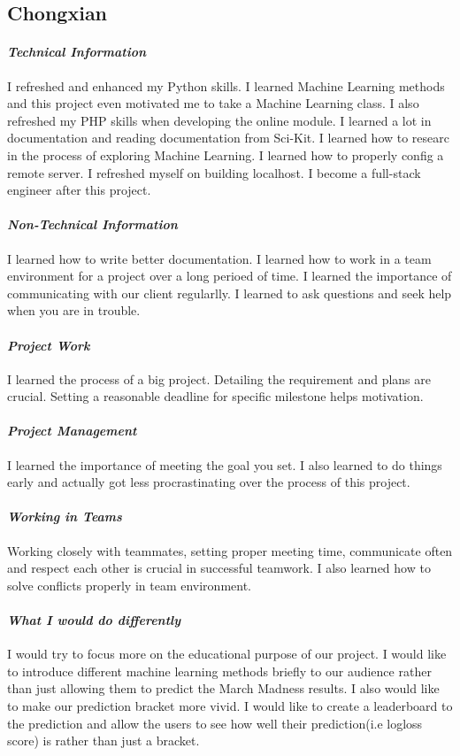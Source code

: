 \documentclass[onecolumn, draftclsnofoot,10pt, compsoc]{IEEEtran}
\begin{document}
\subsection{Chongxian}
\paragraph{\emph{Technical Information}}
I refreshed and enhanced my Python skills. I learned Machine Learning methods and this project even motivated me to take a Machine Learning class. I also refreshed my PHP skills when developing the online module. I learned a lot in documentation and reading documentation from Sci-Kit. I learned how to researc in the process of exploring Machine Learning. I learned how to properly config a remote server. I refreshed myself on building localhost. I become a full-stack engineer after this project.
\paragraph{\emph{Non-Technical Information}}
I learned how to write better documentation. I learned how to work in a team environment for a project over a long perioed of time. I learned the importance of communicating with our client regularlly. I learned to ask questions and seek help when you are in trouble. 
\paragraph{\emph{Project Work}}
I learned the process of a big project. Detailing the requirement and plans are crucial. Setting a reasonable deadline for specific milestone helps motivation. 
\paragraph{\emph{Project Management}}
I learned the importance of meeting the goal you set. I also learned to do things early and actually got less procrastinating over the process of this project.
\paragraph{\emph{Working in Teams}}
Working closely with teammates, setting proper meeting time, communicate often and respect each other is crucial in successful teamwork. I also learned how to solve conflicts properly in team environment.
\paragraph{\emph{What I would do differently}}
I would try to focus more on the educational purpose of our project. I would like to introduce different machine learning methods briefly to our audience rather than just allowing them to predict the March Madness results. I also would like to make our prediction bracket more vivid. I would like to create a leaderboard to the prediction and allow the users to see how well their prediction(i.e logloss score) is rather than just a bracket.
\end{document}
